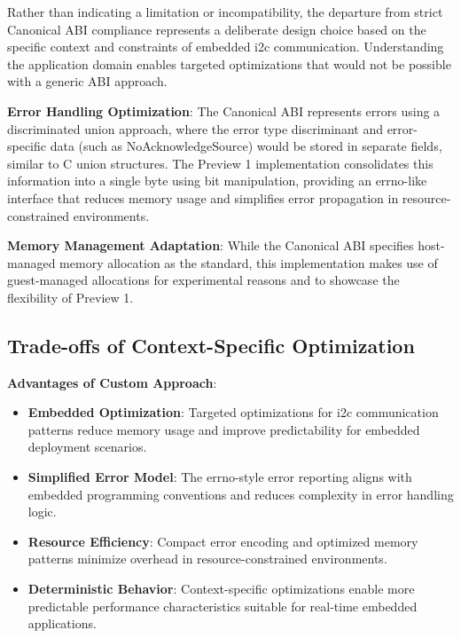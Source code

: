 Rather than indicating a limitation or incompatibility, the departure from strict Canonical ABI compliance represents a deliberate design choice based on the specific context and constraints of embedded \acrshort{i2c} communication. Understanding the application domain enables targeted optimizations that would not be possible with a generic ABI approach.

\textbf{Error Handling Optimization}: The Canonical ABI represents errors using a discriminated union approach, where the error type discriminant and error-specific data (such as NoAcknowledgeSource) would be stored in separate fields, similar to C union structures. The Preview 1 implementation consolidates this information into a single byte using bit manipulation, providing an errno-like interface that reduces memory usage and simplifies error propagation in resource-constrained environments.

\textbf{Memory Management Adaptation}: While the Canonical ABI specifies host-managed memory allocation as the standard, this implementation makes use of guest-managed allocations for experimental reasons and to showcase the flexibility of Preview 1.

\subsection{Trade-offs of Context-Specific Optimization}

\textbf{Advantages of Custom Approach}:
\begin{itemize}
    \item \textbf{Embedded Optimization}: Targeted optimizations for \acrshort{i2c} communication patterns reduce memory usage and improve predictability for embedded deployment scenarios.
    \item \textbf{Simplified Error Model}: The errno-style error reporting aligns with embedded programming conventions and reduces complexity in error handling logic.
    \item \textbf{Resource Efficiency}: Compact error encoding and optimized memory patterns minimize overhead in resource-constrained environments.
    \item \textbf{Deterministic Behavior}: Context-specific optimizations enable more predictable performance characteristics suitable for real-time embedded applications.
\end{itemize}

